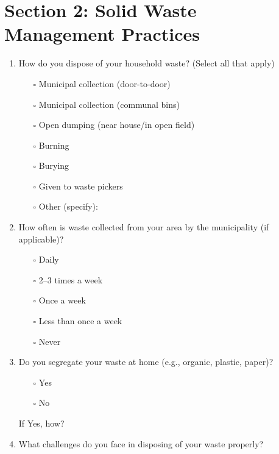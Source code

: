 \section*{Section 2: Solid Waste Management Practices}

\begin{enumerate}[label=\arabic*., start=9]
    \item How do you dispose of your household waste? (Select all that apply)
    \begin{itemize}
        \item[$\square$] Municipal collection (door-to-door)
        \item[$\square$] Municipal collection (communal bins)
        \item[$\square$] Open dumping (near house/in open field)
        \item[$\square$] Burning
        \item[$\square$] Burying
        \item[$\square$] Given to waste pickers
        \item[$\square$] Other (specify): \hrulefill
    \end{itemize}

    \item How often is waste collected from your area by the municipality (if applicable)?
    \begin{itemize}
        \item[$\square$] Daily
        \item[$\square$] 2--3 times a week
        \item[$\square$] Once a week
        \item[$\square$] Less than once a week
        \item[$\square$] Never
    \end{itemize}

    \item Do you segregate your waste at home (e.g., organic, plastic, paper)?
    \begin{itemize}
        \item[$\square$] Yes \quad \item[$\square$] No
    \end{itemize}
    If Yes, how? \hrulefill

    \item What challenges do you face in disposing of your waste properly? \\
    \vspace{1em}\hrulefill \\[1em]
    \hrulefill
\end{enumerate}

